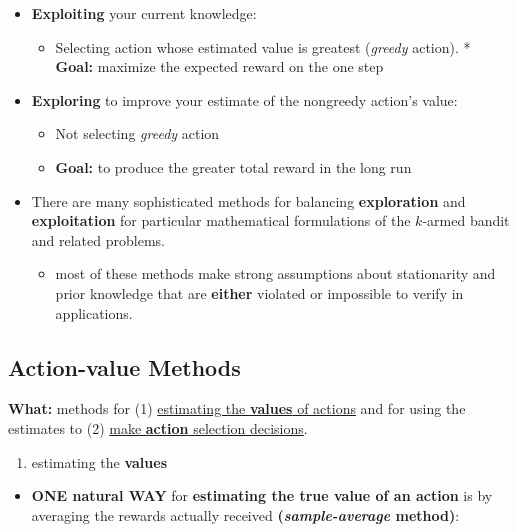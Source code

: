 \documentclass[12pt, a4paper]{article}
\begin{document}
\begin{itemize}
  \item \textbf{Exploiting} your current knowledge:
  \begin{itemize}
    \item Selecting action whose estimated value is greatest
   (\emph{greedy} action). * \textbf{Goal:} maximize the expected reward on the one step
  \end{itemize}
  \item \textbf{Exploring} to improve your estimate of the nongreedy action's value:
  \begin{itemize}
  \item
    Not selecting \emph{greedy} action
  \item
    \textbf{Goal:} to produce the greater total reward in the long run
  \end{itemize}
\item
  There are many sophisticated methods for balancing
  \textbf{exploration} and \textbf{exploitation} for particular
  mathematical formulations of the \(k\)-armed bandit and related
  problems.

  \begin{itemize}
  \item
    most of these methods make strong assumptions about stationarity and
    prior knowledge that are \textbf{either} violated or impossible to
    verify in applications.
  \end{itemize}
\end{itemize}






\subsection{Action-value Methods}\label{action-value-methods}

\textbf{What:} methods for (1) \uline{estimating the \textbf{values} of actions} and for using the estimates to (2) \uline{make \textbf{action} selection decisions}.

\begin{enumerate}
\def\labelenumi{(\arabic{enumi})}
\item
  estimating the \textbf{values}
\end{enumerate}

\begin{itemize}
\item
  \textbf{ONE natural WAY} for \textbf{estimating the true value of an
  action} is by averaging the rewards actually received
  \textbf{(\emph{sample-average} method)}:
\end{itemize}
\end{document}
